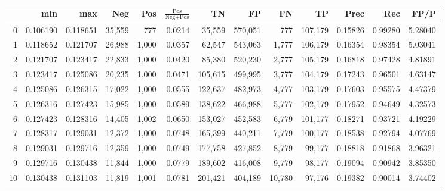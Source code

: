 \begin{tabular}{rrrrrrrrrrrrr}
\toprule
{} &       min &       max &     Neg &    Pos & $\frac{\text{Pos}}{\text{Neg}+\text{Pos}}$ &       TN &       FP &       FN &       TP &     Prec &      Rec &     FP/P \\
\midrule
0   &  0.106190 &  0.118651 &  35,559 &    777 &                                     0.0214 &   35,559 &  570,051 &      777 &  107,179 &  0.15826 &  0.99280 &  5.28040 \\
1   &  0.118652 &  0.121707 &  26,988 &  1,000 &                                     0.0357 &   62,547 &  543,063 &    1,777 &  106,179 &  0.16354 &  0.98354 &  5.03041 \\
2   &  0.121707 &  0.123417 &  22,833 &  1,000 &                                     0.0420 &   85,380 &  520,230 &    2,777 &  105,179 &  0.16818 &  0.97428 &  4.81891 \\
3   &  0.123417 &  0.125086 &  20,235 &  1,000 &                                     0.0471 &  105,615 &  499,995 &    3,777 &  104,179 &  0.17243 &  0.96501 &  4.63147 \\
4   &  0.125086 &  0.126315 &  17,022 &  1,000 &                                     0.0555 &  122,637 &  482,973 &    4,777 &  103,179 &  0.17603 &  0.95575 &  4.47379 \\
5   &  0.126316 &  0.127423 &  15,985 &  1,000 &                                     0.0589 &  138,622 &  466,988 &    5,777 &  102,179 &  0.17952 &  0.94649 &  4.32573 \\
6   &  0.127423 &  0.128316 &  14,405 &  1,002 &                                     0.0650 &  153,027 &  452,583 &    6,779 &  101,177 &  0.18271 &  0.93721 &  4.19229 \\
7   &  0.128317 &  0.129031 &  12,372 &  1,000 &                                     0.0748 &  165,399 &  440,211 &    7,779 &  100,177 &  0.18538 &  0.92794 &  4.07769 \\
8   &  0.129031 &  0.129716 &  12,359 &  1,000 &                                     0.0749 &  177,758 &  427,852 &    8,779 &   99,177 &  0.18818 &  0.91868 &  3.96321 \\
9   &  0.129716 &  0.130438 &  11,844 &  1,000 &                                     0.0779 &  189,602 &  416,008 &    9,779 &   98,177 &  0.19094 &  0.90942 &  3.85350 \\
10  &  0.130438 &  0.131103 &  11,819 &  1,001 &                                     0.0781 &  201,421 &  404,189 &   10,780 &   97,176 &  0.19382 &  0.90014 &  3.74402 \\

\end{tabular}
